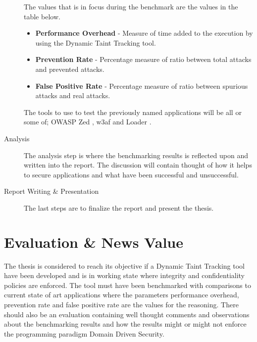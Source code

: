 \documentclass{../kththesis}
\begin{document}
\begin{description}
		The values that is in focus during the benchmark are the values in the table below. 
		
		\begin{itemize}  
			\item \textbf{Performance Overhead} - Measure of time added to the execution by using the Dynamic Taint Tracking tool.
			\item \textbf{Prevention Rate} - Percentage measure of ratio between total attacks and prevented attacks.
			\item \textbf{False Positive Rate} - Percentage measure of ratio between spurious attacks and real attacks.
		\end{itemize}
	
		The tools to use to test the previously named applications will be all or some of; OWASP Zed \parencite{zed}, w3af \parencite{w3af} and Loader \parencite{loader}.
	
		\item [Analysis]
		The analysis step is where the benchmarking results is reflected upon and written into the report. The discussion will contain thought of how it helps to secure applications and what have been successful and unsuccessful.
	
		\item [Report Writing \& Presentation]
		The last steps are to finalize the report and present the thesis.
	\end{description}
	
	
	
	\chapter{Evaluation \& News Value}
	The thesis is considered to reach its objective if a Dynamic Taint Tracking tool have been developed and is in working state where integrity and confidentiality policies are enforced. The tool must have been benchmarked with comparisons to current state of art applications where the parameters performance overhead, prevention rate and false positive rate are the values for the reasoning. There should also be an evaluation containing well thought comments and observations about the benchmarking results and how the results might or might not enforce the programming paradigm Domain Driven Security.
	
\end{document}
